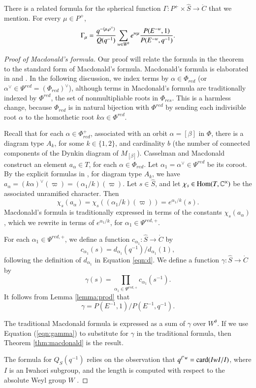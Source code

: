 There is a related formula for the spherical function
$\Gamma:P^+\times\hat S\to\ring{C}$ that we mention.  For every
$\mu\in P^+$,
\begin{equation} 
\Gamma_\mu = 
\frac{q^{-\langle{\mu,\rho^\vee}\rangle}}{ Q(q^{-1})} 
\sum_{w\in W^\theta} e^{w\mu} \frac{P(E^{-w},1)}{P(E^{-w},q^{-1})}.
\end{equation}

\begin{proof}[Proof of Macdonald's formula]
  Our proof will relate the formula in the theorem to the standard
  form of Macdonald's formula.  Macdonald's formula is elaborated in
  \cite{casselman1980unramified} and \cite{casselman2005companion}.
  In the following discussion, we index terms by
  $\alpha\in\Phi_{red}$ (or $\alpha^\vee\in \Psi^{red} =
  (\Phi_{red})^\vee$), although terms in Macdonald's formula are
  traditionally indexed by $\Phi^{red}$, the set of nonmultipliable
  roots in $\Phi_{res}$.  This is a harmless change, because
  $\Phi_{red}$ is in natural bijection with $\Phi^{red}$ by
  sending each indivisible root $\alpha$ to the homothetic root
  $k\alpha\in\Phi^{red}$.

  Recall that for each $\alpha\in \Phi^+_{red}$, associated with an
  orbit $\alpha=[\beta]$ in $\Phi$, there is a diagram type $A_k$, for
  some $k\in\{1,2\}$, and cardinality $b$ (the number of connected
  components of the Dynkin diagram of $M_{[\beta]}$).  Casselman and
  Macdonald construct an element $a_{\alpha}\in T$, for each
  $\alpha\in\Phi_{red}$.  Let $\alpha_1 = \alpha^\vee\in \Psi^{red}$
  be its coroot.  By the explicit formulas in
  \cite{casselman2005companion}, for diagram type $A_k$, we have
  $a_\alpha = (k\alpha)^\vee(\varpi) = (\alpha_1/k)(\varpi)$.  Let
  $s\in \hat S$, and let $\chi_s\in{\operatorname{Hom}}(T,\mathbb{C}^\times)$ be the
  associated unramified character.  Then
\[
\chi_s(a_{\alpha}) = \chi_s((\alpha_1/k)(\varpi)) = e^{\alpha_1/k}(s).
\]
Macdonald's formula is traditionally expressed in terms of the
constants $\chi_s(a_\alpha)$, which we rewrite in terms of
$e^{\alpha_1/k}$, for $\alpha_1\in\Psi^{red,+}$.

For each $\alpha_1\in\Psi^{red,+}$, we define a function
$c_{\alpha_1}:\hat S\to\ring{C}$ by
\[
c_{\alpha_1}(s) = d_{\alpha_1}(q^{-1})/d_{\alpha_1}(1),
\]
following the definition of $d_{\alpha_1}$ in Equation \ref{eqn:d}.
We define a function $\gamma:\hat S\to \ring{C}$ by
\[
\gamma(s)  = \prod_{\alpha_1\in \Psi^{red,+}} c_{\alpha_1}(s^{-1}).
\]
It follows from Lemma \ref{lemma:prod} that
\begin{equation}\label{eqn:gamma}
\gamma = P(E^{-1},1)/P(E^{-1},q^{-1}).
\end{equation}

The traditional Macdonald formula is expressed as a sum of $\gamma$
over $W^\theta$.  If we use Equation (\ref{eqn:gamma}) to substitute
for $\gamma$ in the traditional formula, then Theorem
\ref{thm:macdonald} is the result.

The formula for $Q_S(q^{-1})$ relies on the observation that $q^{\ell'
  w} = {\operatorname{card}}(IwI/I)$, where $I$ is an Iwahori subgroup, and the
length is computed with respect to the absolute Weyl group $W$
\cite[p.74]{carter1985finite}.
\end{proof}


